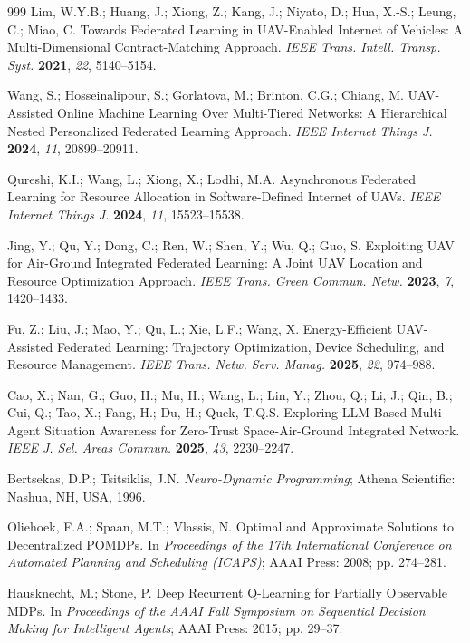 \documentclass[notspecified,article,submit,moreauthors]{Definitions/mdpi}
\begin{document}
\begin{thebibliography}{999}
Lim, W.Y.B.; Huang, J.; Xiong, Z.; Kang, J.; Niyato, D.; Hua, X.-S.; Leung, C.; Miao, C. Towards Federated Learning in UAV-Enabled Internet of Vehicles: A Multi-Dimensional Contract-Matching Approach. {\em IEEE Trans. Intell. Transp. Syst.} {\bf 2021}, {\em 22}, 5140--5154.

Wang, S.; Hosseinalipour, S.; Gorlatova, M.; Brinton, C.G.; Chiang, M. UAV-Assisted Online Machine Learning Over Multi-Tiered Networks: A Hierarchical Nested Personalized Federated Learning Approach. {\em IEEE Internet Things J.} {\bf 2024}, {\em 11}, 20899--20911.

Qureshi, K.I.; Wang, L.; Xiong, X.; Lodhi, M.A. Asynchronous Federated Learning for Resource Allocation in Software-Defined Internet of UAVs. {\em IEEE Internet Things J.} {\bf 2024}, {\em 11}, 15523--15538.

Jing, Y.; Qu, Y.; Dong, C.; Ren, W.; Shen, Y.; Wu, Q.; Guo, S. Exploiting UAV for Air-Ground Integrated Federated Learning: A Joint UAV Location and Resource Optimization Approach. {\em IEEE Trans. Green Commun. Netw.} {\bf 2023}, {\em 7}, 1420--1433.

Fu, Z.; Liu, J.; Mao, Y.; Qu, L.; Xie, L.F.; Wang, X. Energy-Efficient UAV-Assisted Federated Learning: Trajectory Optimization, Device Scheduling, and Resource Management. {\em IEEE Trans. Netw. Serv. Manag.} {\bf 2025}, {\em 22}, 974--988.

Cao, X.; Nan, G.; Guo, H.; Mu, H.; Wang, L.; Lin, Y.; Zhou, Q.; Li, J.; Qin, B.; Cui, Q.; Tao, X.; Fang, H.; Du, H.; Quek, T.Q.S. Exploring LLM-Based Multi-Agent Situation Awareness for Zero-Trust Space-Air-Ground Integrated Network. {\em IEEE J. Sel. Areas Commun.} {\bf 2025}, {\em 43}, 2230--2247.

Bertsekas, D.P.; Tsitsiklis, J.N. {\em Neuro-Dynamic Programming}; Athena Scientific: Nashua, NH, USA, 1996.

Oliehoek, F.A.; Spaan, M.T.; Vlassis, N. Optimal and Approximate Solutions to Decentralized POMDPs. In {\em Proceedings of the 17th International Conference on Automated Planning and Scheduling (ICAPS)}; AAAI Press: 2008; pp. 274--281.


Hausknecht, M.; Stone, P. Deep Recurrent Q-Learning for Partially Observable MDPs. In {\em Proceedings of the AAAI Fall Symposium on Sequential Decision Making for Intelligent Agents}; AAAI Press: 2015; pp. 29--37.


\end{thebibliography}
\end{document}

